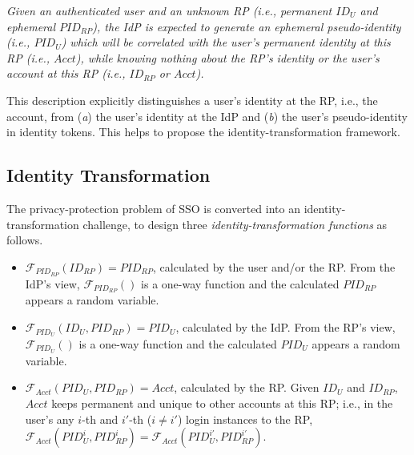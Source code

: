 \emph{Given an authenticated user and an unknown RP (i.e., permanent $ID_U$ and ephemeral $PID_{RP}$),
    the IdP is expected to generate an ephemeral pseudo-identity (i.e., $PID_{U}$)
     which will be correlated with the user's permanent identity at this RP (i.e., $Acct$),
     while knowing nothing about the RP's identity or the user's account at this RP (i.e., $ID_{RP}$ or $Acct$).}


This description explicitly distinguishes a user's identity at the RP, i.e., the account,
     from (\emph{a}) the user's identity at the IdP and (\emph{b}) the user's pseudo-identity in identity tokens.
This 
    helps to propose the identity-transformation framework.


\subsection{Identity Transformation}
\label{subsec:solutions}



The privacy-protection problem of SSO is converted into an identity-transformation challenge,
 to design three \emph{identity-transformation functions} as follows.
\begin{itemize}
\item
$\mathcal{F}_{PID_{RP}}(ID_{RP}) = PID_{RP}$, calculated by the user and/or the RP.
From the IdP's view,
$\mathcal{F}_{PID_{RP}}()$ is a one-way function and the calculated $PID_{RP}$ appears a random variable.
\item
$\mathcal{F}_{PID_U}(ID_U, PID_{RP}) = PID_{U}$, calculated by the IdP.
From the RP's view,
    $\mathcal{F}_{PID_U}()$ is a one-way function and the calculated $PID_{U}$ appears a random variable.
\item
$\mathcal{F}_{Acct}(PID_{U}, PID_{RP}) = Acct$, calculated by the RP.
Given $ID_U$ and $ID_{RP}$, $Acct$ keeps permanent and unique to other accounts at this RP;
    i.e., in the user's any $i$-th and $i'$-th ($i \neq i'$) login instances to the RP,
 $\mathcal{F}_{Acct}(PID_{U}^i, PID_{RP}^i) = \mathcal{F}_{Acct}(PID_{U}^{i'}, PID_{RP}^{i'})$.
\end{itemize}


